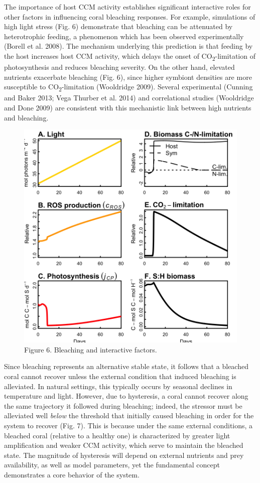 \documentclass[]{elsarticle} %
\makeatletter
\def\maxwidth{\ifdim\Gin@nat@width>\linewidth\linewidth
\else\Gin@nat@width\fi}
\let\Oldincludegraphics\includegraphics
\renewcommand{\includegraphics}[1]{\Oldincludegraphics[width=\maxwidth]{#1}}
\makeatother
\begin{document}
The importance of host CCM activity establishes significant interactive
roles for other factors in influencing coral bleaching responses. For
example, simulations of high light stress (Fig. 6) demonstrate that
bleaching can be attenuated by heterotrophic feeding, a phenomenon which
has been observed experimentally (Borell et al. 2008). The mechanism
underlying this prediction is that feeding by the host increases host
CCM activity, which delays the onset of CO\textsubscript{2}-limitation
of photosynthesis and reduces bleaching severity. On the other hand,
elevated nutrients exacerbate bleaching (Fig. 6), since higher symbiont
densities are more susceptible to CO\textsubscript{2}-limitation
(Wooldridge 2009). Several experimental (Cunning and Baker 2013; Vega
Thurber et al. 2014) and correlational studies (Wooldridge and Done
2009) are consistent with this mechanistic link between high nutrients
and bleaching.

\begin{figure}[htbp]
\centering
\includegraphics{../img/Fig6.png}
\caption{Figure 6. Bleaching and interactive factors.}
\end{figure}

Since bleaching represents an alternative stable state, it follows that
a bleached coral cannot recover unless the external condition that
induced bleaching is alleviated. In natural settings, this typically
occurs by seasonal declines in temperature and light. However, due to
hysteresis, a coral cannot recover along the same trajectory it followed
during bleaching; indeed, the stressor must be alleviated well
\emph{below} the threshold that initially caused bleaching in order for
the system to recover (Fig. 7). This is because under the same external
conditions, a bleached coral (relative to a healthy one) is
characterized by greater light amplification and weaker CCM activity,
which serve to maintain the bleached state. The magnitude of hysteresis
will depend on external nutrients and prey availability, as well as
model parameters, yet the fundamental concept demonstrates a core
behavior of the system.
\end{document}
